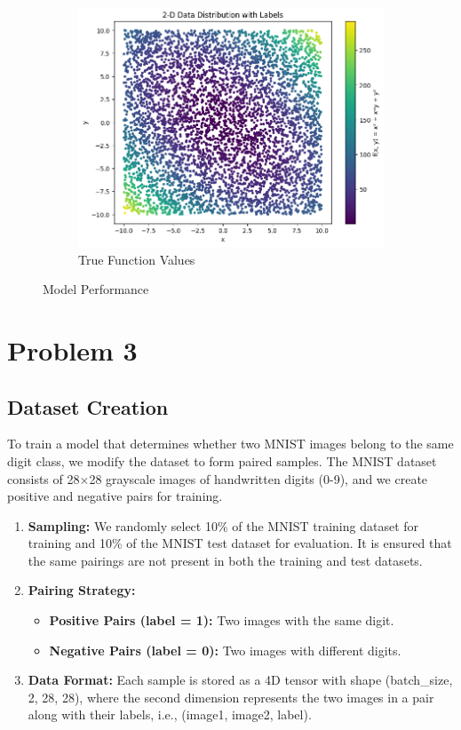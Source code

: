 \documentclass{article}
\begin{document}
\begin{figure}[ht]
\begin{subfigure}{0.3\textwidth}
    \includegraphics[width=\textwidth]{images/q2_data_dist_orig.png}
    \caption{True Function Values}
  \end{subfigure}
  \caption{Model Performance}
  \label{fig:model_perf}
\end{figure}

\section*{Problem 3}
\subsection*{Dataset Creation}
To train a model that determines whether two MNIST images belong to the same digit class, we modify the dataset to form paired samples. The MNIST dataset consists of 28$\times$28 grayscale images of handwritten digits (0-9), and we create positive and negative pairs for training.

\begin{enumerate}
  \item \textbf{Sampling:} We randomly select 10\% of the MNIST training dataset for training and 10\% of the MNIST test dataset for evaluation. It is ensured that the same pairings are not present in both the training and test datasets.
  \item \textbf{Pairing Strategy:}
  \begin{itemize}
    \item \textbf{Positive Pairs (label = 1):} Two images with the same digit.
    \item \textbf{Negative Pairs (label = 0):} Two images with different digits.
  \end{itemize}
  \item \textbf{Data Format:} Each sample is stored as a 4D tensor with shape (batch\_size, 2, 28, 28), where the second dimension represents the two images in a pair along with their labels, i.e., (image1, image2, label).
\end{enumerate}
\end{document}
